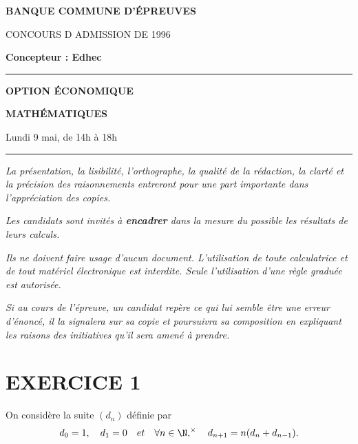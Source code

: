 \documentclass[11pt]{article}%
\begin{document}

\begin{center}
{\LARG\E\textbf{BANQUE COMMUNE D'ÉPREUVES}}



{\large \textsc{CONCOURS D ADMISSION DE 1996}}



{\large \textbf{Concepteur : Edhec}}



\rule{2.39cm}{0.05cm}



{\Large \textbf{OPTION ÉCONOMIQUE}}



{\Large \textbf{MATHÉMATIQUES }}



{\Large Lundi 9 mai, de 14h à 18h}



\rule{2.39cm}{0.05cm}
\end{center}

\textit{La présentation, la lisibilité, l'orthographe, la qualité
de la rédaction, la clarté et la précision des raisonnements
entreront pour une part importante dans l'appréciation des copies.}

\textit{Les candidats sont invités à \textbf{encadrer} dans la mesure
du possible les résultats de leurs calculs.}

\textit{Ils ne doivent faire usage d'aucun document. L'utilisation de
toute
calculatrice et de tout matériel électronique est interdite. Seule
l'utilisation d'une règle graduée est autorisée.}

\textit{Si au cours de l'épreuve, un candidat repère ce qui lui semble
être une erreur d'énoncé, il la signalera sur sa copie et
poursuivra sa composition en expliquant les raisons des initiatives
qu'il sera
amené à prendre.}

\vspace*{3cm}

\section*{EXERCICE 1}

On considère la suite $(d_{n})$ définie par 
\[
d_{0} = 1,\quad d_{1} = 0\quad et\quad \forall n\in \N,^{\times }\quad
d_{n + 1} = n(d_{n} + d_{n-1}).
\]
\end{document}
